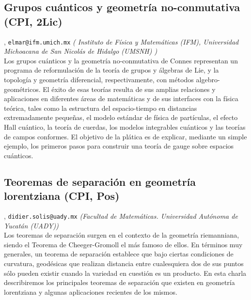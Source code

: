 \subsection{\sffamily Grupos cu\'anticos y geometr\'ia no-conmutativa {\footnotesize (CPI, 2Lic)}} \label{reg-773} 
, {\tt elmar@ifm.umich.mx}  {\slshape ( Instituto de F\'isica y Matem\'aticas (IFM),  Universidad Michoacana de San Nicol\'as de Hidalgo (UMSNH) )}\\
          \noindent Los grupos cu\'anticos y la geometr\'ia no-conmutativa de Connes representan un programa de reformulaci\'on de la teor\'ia de grupos y \'algebras de Lie, y la topolog\'ia y geometr\'ia diferencial, respectivamente, con m\'etodos algebro-geom\'etricos. El \'exito de esas teor\'ias resulta de sus amplias relaciones y aplicaciones en diferentes \'areas de matem\'aticas y de sus interfaces con la f\'isica te\'orica, tales como la estructura del espacio-tiempo en distancias extremadamente peque\~nas,  el modelo est\'andar de f\'isica de part\'iculas, el efecto Hall cu\'antico, la teor\'ia de cuerdas, los modelos integrables cu\'anticos y las teor\'ias de campos conformes. El objetivo de la pl\'atica es de explicar, mediante un simple ejemplo, los primeros pasos para construir una teor\'ia de gauge sobre espacios cu\'anticos.
\subsection{\sffamily Teoremas de separaci\'on en geometr\'ia lorentziana {\footnotesize (CPI, Pos)}} \label{reg-1566} 
, {\tt didier.solis@uady.mx}  {\slshape (Facultad de Matem\'aticas. Universidad Aut\'onoma de Yucat\'an (UADY))}\\
          \noindent Los teoremas de separaci\'on surgen en el contexto de la geometr\'ia riemanniana, siendo el Teorema de Cheeger-Gromoll el m\'as famoso de ellos. En t\'erminos muy generales, un teorema de separaci\'on establece que bajo ciertas condiciones de curvatura, geod\'esicas que realizan distancia entre cualesquiera dos de sus puntos s\'olo pueden existir cuando la variedad en cuesti\'on es un producto.  En esta charla describiremos los principales teoremas de separaci\'on que existen en geometr\'ia lorentziana y algunas aplicaciones recientes de los mismos.
